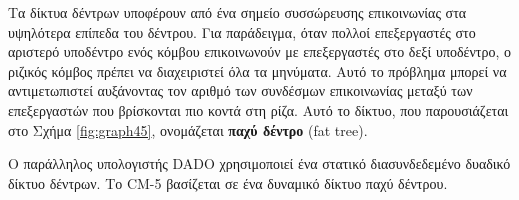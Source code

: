 \documentclass[12pt,a4paper]{article} %
\begin{document}
Τα δίκτυα δέντρων υποφέρουν από ένα σημείο συσσώρευσης επικοινωνίας στα 
υψηλότερα επίπεδα του δέντρου. Για παράδειγμα, όταν πολλοί επεξεργαστές 
στο αριστερό υποδέντρο ενός κόμβου επικοινωνούν με επεξεργαστές στο δεξί 
υποδέντρο, ο ριζικός κόμβος πρέπει να διαχειριστεί όλα τα μηνύματα. 
Αυτό το πρόβλημα μπορεί να αντιμετωπιστεί αυξάνοντας τον αριθμό των συνδέσμων 
επικοινωνίας μεταξύ των επεξεργαστών που βρίσκονται πιο κοντά στη ρίζα. 
Αυτό το δίκτυο, που παρουσιάζεται στο Σχήμα \ref{fig:graph45}, ονομάζεται 
\textbf{παχύ δέντρο} (fat tree).

Ο παράλληλος υπολογιστής DADO χρησιμοποιεί ένα 
στατικό διασυνδεδεμένο δυαδικό δίκτυο δέντρων. Το CM-5 
βασίζεται σε ένα δυναμικό δίκτυο παχύ δέντρου.

\begin{figure}[H]
\centering
{}
\end{figure}
\end{document}

